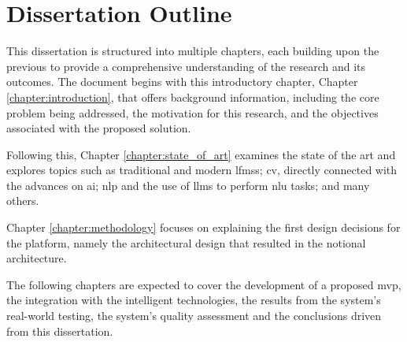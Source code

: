 \section{Dissertation Outline} \label{section:dissertation_outline}

This dissertation is structured into multiple chapters, each building upon the previous to provide a comprehensive understanding of the research and its outcomes. The document begins with this introductory chapter, Chapter  \ref{chapter:introduction}, that offers background information, including the core problem being addressed, the motivation for this research, and the objectives associated with the proposed solution.

Following this, Chapter \ref{chapter:state_of_art} examines the state of the art and explores topics such as traditional and modern \acp{lfms}; \ac{cv}, directly connected with the advances on \ac{ai}; \ac{nlp} and the use of \acp{llm} to perform \ac{nlu} tasks; and many others.

Chapter \ref{chapter:methodology} focuses on explaining the first design decisions for the platform, namely the architectural design that resulted in the notional architecture.

The following chapters are expected to cover the development of a proposed \ac{mvp}, the integration with the intelligent technologies, the results from the system's real-world testing, the system's quality assessment and the conclusions driven from this dissertation.
